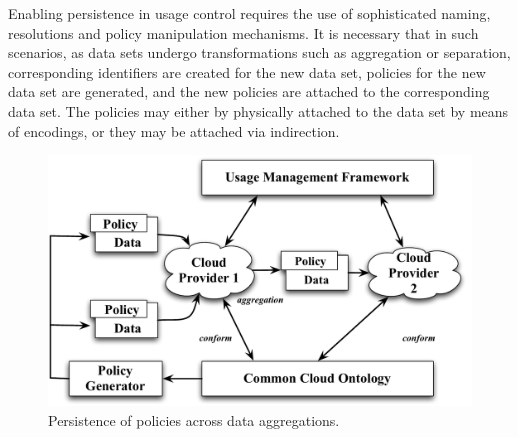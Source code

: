 \documentclass[10pt, conference, compsocconf]{IEEEtran}
\begin{document}
Enabling persistence in usage control requires the use of sophisticated naming, resolutions and policy manipulation mechanisms. It is necessary that in such scenarios, as data sets undergo transformations such as aggregation or separation, corresponding identifiers are created for the new data set, policies for the new data set are generated, and the new policies are attached to the corresponding data set. The policies may either by physically attached to the data set by means of encodings, or they may be attached via indirection. 





\begin{figure}[!t]
\centering
\includegraphics[scale=0.4]{dynamics}
\caption{Persistence of policies across data aggregations.}
\label{fig:dynamics}
\end{figure}
\end{document}
